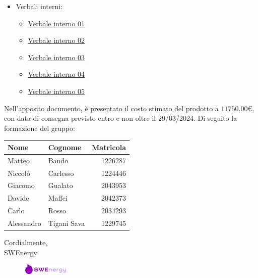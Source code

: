 \begin{itemize}
	\item Verbali interni:
		\begin{itemize}
			\item
				\href{https://github.com/Project-SWEnergy/documentazione/blob/main/Candidatura/Verbale\%20interno\%20-\%2001.pdf}{Verbale interno 01}
			\item
				\href{https://github.com/Project-SWEnergy/documentazione/blob/main/Candidatura/Verbale\%20interno\%20-\%2002.pdf}{Verbale interno 02}
			\item
				\href{https://github.com/Project-SWEnergy/documentazione/blob/main/Candidatura/Verbale\%20interno\%20-\%2003.pdf}{Verbale interno 03}
			\item
				\href{https://github.com/Project-SWEnergy/documentazione/blob/main/Candidatura/Verbale\%20interno\%20-\%2004.pdf}{Verbale interno 04}
			\item
				\href{https://github.com/Project-SWEnergy/documentazione/blob/main/Candidatura/Verbale\%20interno\%20-\%2005.pdf}{Verbale interno 05}
		\end{itemize}
\end{itemize}


Nell’apposito documento, è presentato il costo stimato del prodotto a 
$11750.00$€, 
con data di consegna previsto entro e non oltre il 29/03/2024. Di seguito la
formazione del gruppo:

\begin{center}
{
\renewcommand{\arraystretch}{1.5}
\begin{tabular}{llr}
	\textbf{Nome} & \textbf{Cognome}	& \textbf{Matricola}		\\
	\toprule
	Matteo		&	Bando				&	1226287					\\
	Niccolò 	&	Carlesso		 	& 	1224446					\\
	Giacomo 	&	Gualato			 	& 	2043953					\\
	Davide		&	Maffei			 	& 	2042373					\\
	Carlo		&	Rosso			 	&	2034293					\\
	Alessandro	&	Tigani Sava		 	&	1229745					\\
	\bottomrule
\end{tabular}
}
\end{center}

\vspace{1cm}

\noindent
Cordialmente, \\
SWEnergy

\begin{figure}[H]
	\includegraphics[width=0.2\textwidth]{img/sign.png}
\end{figure}
